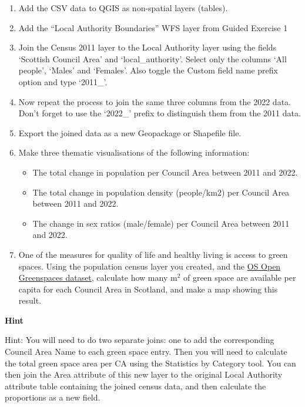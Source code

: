 \documentclass[
  letterpaper,
  DIV=11,
  numbers=noendperiod]{scrreprt}
\providecommand{\tightlist}{%
  \setlength{\itemsep}{0pt}\setlength{\parskip}{0pt}}\usepackage{longtable,booktabs,array}
\begin{document}
\begin{enumerate}
\def\labelenumi{\arabic{enumi})}
\item
  Add the CSV data to QGIS as non-spatial layers (tables).
\item
  Add the ``Local Authority Boundaries'' WFS layer from Guided Exercise
  1
\item
  Join the Census 2011 layer to the Local Authority layer using the
  fields `Scottish Council Area' and `local\_authority'. Select only the
  columns `All people', `Males' and `Females'. Also toggle the Custom
  field name prefix option and type `2011\_'.
\item
  Now repeat the process to join the same three columns from the 2022
  data. Don't forget to use the `2022\_' prefix to distinguish them from
  the 2011 data.
\item
  Export the joined data as a new Geopackage or Shapefile file.
\item
  Make three thematic visualisations of the following information:

  \begin{itemize}
  \tightlist
  \item
    The total change in population per Council Area between 2011 and
    2022.
  \item
    The total change in population density (people/km2) per Council Area
    between 2011 and 2022.
  \item
    The change in sex ratios (male/female) per Council Area between 2011
    and 2022.
  \end{itemize}
\item
  One of the measures for quality of life and healthy living is access
  to green spaces. Using the population census layer you created, and
  the \href{https://osdatahub.os.uk/downloads/open/OpenGreenspace}{OS
  Open Greenspaces dataset}, calculate how many m\(^2\) of green space
  are available per capita for each Council Area in Scotland, and make a
  map showing this result.
\end{enumerate}

\begin{tcolorbox}[enhanced jigsaw, leftrule=.75mm, colframe=quarto-callout-tip-color-frame, breakable, toprule=.15mm, bottomrule=.15mm, arc=.35mm, rightrule=.15mm, opacityback=0, colback=white, left=2mm]

\vspace{-3mm}\textbf{Hint}\vspace{3mm}

Hint: You will need to do two separate joins: one to add the
corresponding Council Area Name to each green space entry. Then you will
need to calculate the total green space area per CA using the Statistics
by Category tool. You can then join the Area attribute of this new layer
to the original Local Authority attribute table containing the joined
census data, and then calculate the proportions as a new field.

\end{tcolorbox}
\end{document}
